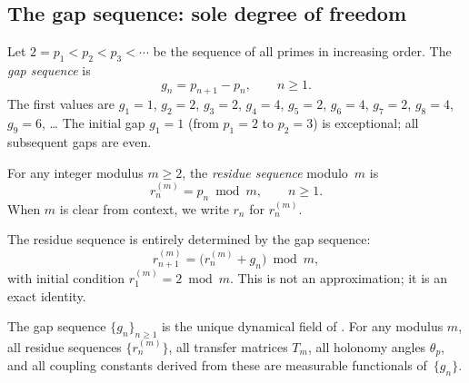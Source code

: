 \documentclass[12pt,a4paper]{article}
\begin{document}
\subsection{The gap sequence: sole degree of freedom}
\label{sec:gap_sequence}

\begin{definition}
\label{def:gaps}
Let $2 = p_1 < p_2 < p_3 < \cdots$ be the sequence of all primes in
increasing order. The \emph{gap sequence} is
\begin{equation}
  g_n = p_{n+1} - p_n, \qquad n \geq 1.
  \label{eq:gap_def}
\end{equation}
The first values are $g_1 = 1$, $g_2 = 2$, $g_3 = 2$, $g_4 = 4$,
$g_5 = 2$, $g_6 = 4$, $g_7 = 2$, $g_8 = 4$, $g_9 = 6$, \ldots
The initial gap $g_1 = 1$ (from $p_1=2$ to $p_2=3$) is exceptional;
all subsequent gaps are even.
\end{definition}

\begin{definition}
\label{def:residue}
For any integer modulus $m \geq 2$, the \emph{residue sequence}
modulo~$m$ is
\begin{equation}
  r_n^{(m)} = p_n \bmod m, \qquad n \geq 1.
  \label{eq:residue_def}
\end{equation}
When $m$ is clear from context, we write $r_n$ for $r_n^{(m)}$.
\end{definition}

The residue sequence is entirely determined by the gap sequence:
\begin{equation}
  r_{n+1}^{(m)} = \bigl(r_n^{(m)} + g_n\bigr) \bmod m,
  \label{eq:gauge_connection}
\end{equation}
with initial condition $r_1^{(m)} = 2 \bmod m$. This is not an
approximation; it is an exact identity.

\mTHM
\begin{theorem}
\label{thm:unique_dof}
The gap sequence $\{g_n\}_{n \geq 1}$ is the unique dynamical field
of \PT. For any modulus $m$, all residue sequences $\{r_n^{(m)}\}$,
all transfer matrices $T_m$, all holonomy angles $\theta_p$, and all
coupling constants derived from these are measurable functionals
of~$\{g_n\}$.
\end{theorem}
\end{document}
